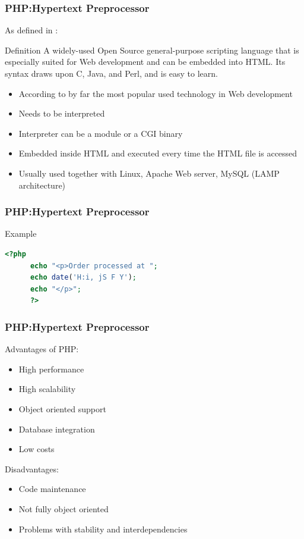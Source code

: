 \documentclass[9pt]{beamer}
\begin{document}
\begin{frame}
\frametitle<presentation>{PHP:Hypertext Preprocessor}
  As defined in \cite{PHPPreface}:
  \begin{block}{Definition}
  A widely-used Open Source general-purpose scripting language that is especially suited for Web development and can be embedded into HTML. Its
  syntax draws upon C, Java, and Perl, and is easy to learn.
  \end{block}
  
  \begin{itemize}
  \item According to \cite{w3TechsStats} by far the most popular used technology in Web development
  \item Needs to be interpreted
  \item Interpreter can be a module or a CGI binary
  \item Embedded inside HTML and executed every time the HTML file is accessed
  \item Usually used together with Linux, Apache Web server, MySQL (LAMP architecture)
  \end{itemize}
  
\end{frame}

\begin{frame}[fragile]
\frametitle<presentation>{PHP:Hypertext Preprocessor}

  \begin{exampleblock}{Example}
    \begin{lstlisting}[language=php, captionpos=b,caption={PHP embedded in HTML. Taken from \cite{welling2008php}},label=lst:php]
      <?php
      echo "<p>Order processed at ";
      echo date('H:i, jS F Y');
      echo "</p>";
      ?>
    \end{lstlisting}
  \end{exampleblock}
\end{frame}

\begin{frame}
\frametitle<presentation>{PHP:Hypertext Preprocessor}

  \begin{multicols}{2}
    Advantages of PHP:
    \begin{itemize}
    \item High performance
    \item High scalability
    \item Object oriented support
    \item Database integration
    \item Low costs
    \end{itemize}
    
    Disadvantages:
    \begin{itemize}
      \item Code maintenance 
      \item Not fully object oriented
      \item Problems with stability and interdependencies
    \end{itemize}
  \end{multicols}

\end{frame}
\end{document}
